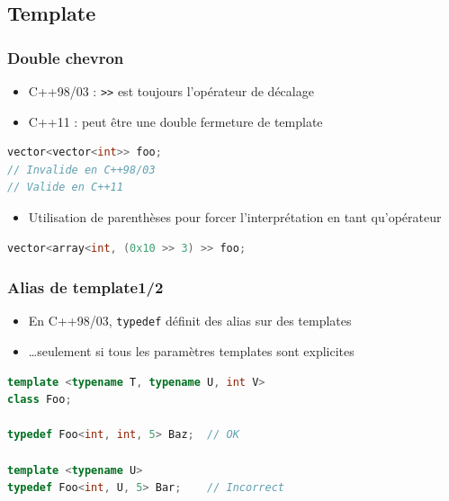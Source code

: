 \documentclass[C++.tex]{subfiles}
\begin{document}
\subsection*{Template}
\begin{frame}[fragile]
	\frametitle{Double chevron}
	\begin{itemize}
		\item C++98/03 : \lstinline|>>| est toujours l'opérateur de décalage
		\item C++11 : peut être une double fermeture de template
	\end{itemize}

	\begin{lstlisting}[language=C++]
vector<vector<int>> foo;
// Invalide en C++98/03
// Valide en C++11\end{lstlisting}


	\begin{itemize}
		\item Utilisation de parenthèses pour forcer l'interprétation en tant qu'opérateur
	\end{itemize}

	\begin{lstlisting}[language=C++]
vector<array<int, (0x10 >> 3) >> foo;\end{lstlisting}
\end{frame}

\begin{frame}[fragile]
	\frametitle{Alias de template\titlehfill{}1/2}
	\begin{itemize}
		\item En C++98/03, \lstinline|typedef| définit des alias sur des templates
		\item \ldots seulement si tous les paramètres templates sont explicites
	\end{itemize}

	\begin{lstlisting}[language=C++]
template <typename T, typename U, int V>
class Foo;

typedef Foo<int, int, 5> Baz;  // OK

template <typename U>
typedef Foo<int, U, 5> Bar;    // Incorrect\end{lstlisting}
\end{frame}
\end{document}
